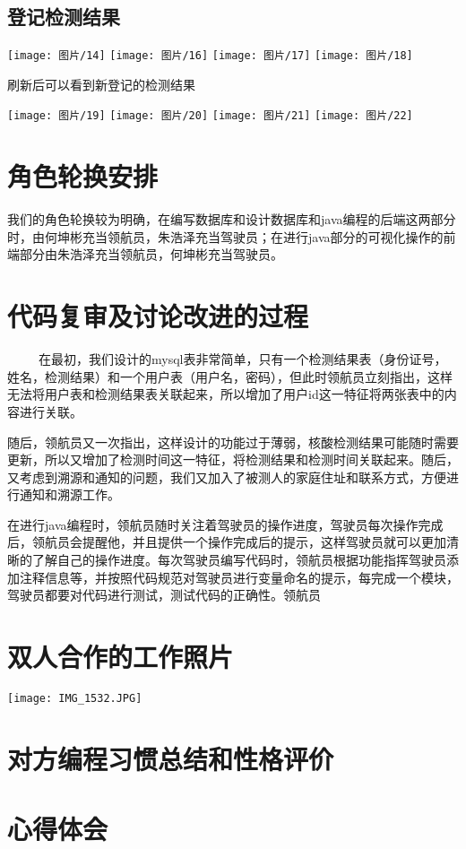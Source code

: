 \documentclass{article}
\begin{document}
\subsection{登记检测结果}
\begin{center}
\texttt{[image: 图片/14]}
\texttt{[image: 图片/16]}
\texttt{[image: 图片/17]}
\texttt{[image: 图片/18]}
\end{center}

刷新后可以看到新登记的检测结果

\begin{center}
\texttt{[image: 图片/19]}
\texttt{[image: 图片/20]}
\texttt{[image: 图片/21]}
\texttt{[image: 图片/22]}
\end{center}
\section{角色轮换安排}
我们的角色轮换较为明确，在编写数据库和设计数据库和java编程的后端这两部分时，由何坤彬充当领航员，朱浩泽充当驾驶员；在进行java部分的可视化操作的前端部分由朱浩泽充当领航员，何坤彬充当驾驶员。
\section{代码复审及讨论改进的过程}
\ \ \ \ \ 在最初，我们设计的mysql表非常简单，只有一个检测结果表（身份证号，姓名，检测结果）和一个用户表（用户名，密码），但此时领航员立刻指出，这样无法将用户表和检测结果表关联起来，所以增加了用户id这一特征将两张表中的内容进行关联。

随后，领航员又一次指出，这样设计的功能过于薄弱，核酸检测结果可能随时需要更新，所以又增加了检测时间这一特征，将检测结果和检测时间关联起来。随后，又考虑到溯源和通知的问题，我们又加入了被测人的家庭住址和联系方式，方便进行通知和溯源工作。

在进行java编程时，领航员随时关注着驾驶员的操作进度，驾驶员每次操作完成后，领航员会提醒他，并且提供一个操作完成后的提示，这样驾驶员就可以更加清晰的了解自己的操作进度。每次驾驶员编写代码时，领航员根据功能指挥驾驶员添加注释信息等，并按照代码规范对驾驶员进行变量命名的提示，每完成一个模块，驾驶员都要对代码进行测试，测试代码的正确性。领航员





\section{双人合作的工作照片}
\centerline{\texttt{[image: IMG\_1532.JPG]}}
\section{对方编程习惯总结和性格评价}
\section{心得体会}
\end{document}
